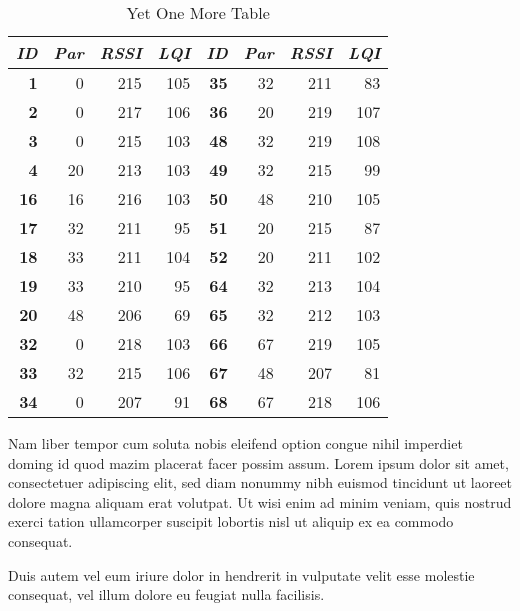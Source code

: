 \begin{table}
\begin{center}
\begin{tabular}{|r|r|r|r||r|r|r|r|}
\hline \textbf{\textit{ID}} & \textbf{\textit{Par}} & \textbf{\textit{RSSI}} &
\textbf{\textit{LQI}} &
\textbf{\textit{ID}} & \textbf{\textit{Par}} & \textbf{\textit{RSSI}} & \textbf{\textit{LQI}} \\
\hline \hline
\textbf{1}  &  0 & 215 & 105 & \textbf{35} & 32 & 211 &  83 \\
\textbf{2}  &  0 & 217 & 106 & \textbf{36} & 20 & 219 & 107 \\
\textbf{3}  &  0 & 215 & 103 & \textbf{48} & 32 & 219 & 108 \\
\textbf{4}  & 20 & 213 & 103 & \textbf{49} & 32 & 215 &  99 \\
\textbf{16} & 16 & 216 & 103 & \textbf{50} & 48 & 210 & 105 \\
\textbf{17} & 32 & 211 &  95 & \textbf{51} & 20 & 215 &  87 \\
\textbf{18} & 33 & 211 & 104 & \textbf{52} & 20 & 211 & 102 \\
\textbf{19} & 33 & 210 &  95 & \textbf{64} & 32 & 213 & 104 \\
\textbf{20} & 48 & 206 &  69 & \textbf{65} & 32 & 212 & 103 \\
\textbf{32} &  0 & 218 & 103 & \textbf{66} & 67 & 219 & 105 \\
\textbf{33} & 32 & 215 & 106 & \textbf{67} & 48 & 207 &  81 \\
\textbf{34} &  0 & 207 &  91 & \textbf{68} & 67 & 218 & 106 \\
\hline
\end{tabular}
\caption{Yet One More Table}
\end{center}
\end{table}


Nam liber tempor cum soluta nobis eleifend option congue nihil imperdiet doming
id quod mazim placerat facer possim assum. Lorem ipsum dolor sit amet,
consectetuer adipiscing elit, sed diam nonummy nibh euismod tincidunt ut laoreet
dolore magna aliquam erat volutpat. Ut wisi enim ad minim veniam, quis nostrud
exerci tation ullamcorper suscipit lobortis nisl ut aliquip ex ea commodo
consequat.

Duis autem vel eum iriure dolor in hendrerit in vulputate velit esse molestie
consequat, vel illum dolore eu feugiat nulla facilisis.

